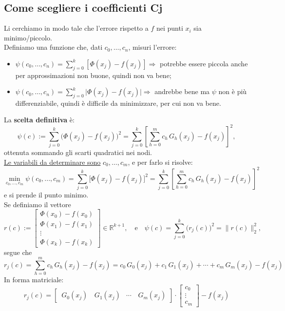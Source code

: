 \documentclass[12pt,a4paper,]{report}
\begin{document}
\subsection{Come scegliere i coefficienti Cj}
Li cerchiamo in modo tale che l'errore rispetto a $f$ nei punti $x_i$ sia minimo/piccolo.\\
Definiamo una funzione che, dati $c_0, \ldots, c_n$, misuri l'errore:
\begin{itemize}
    \item
    $
    \psi(c_0, \ldots, c_n)
    = \sum_{j=0}^{k} \left[ \Phi(x_j) - f(x_j) \right] \Rightarrow
    $
    potrebbe essere piccola anche per approssimazioni non buone,
    quindi non va bene;

    \item
    $
    \psi(c_0, \ldots, c_n)
    = \sum_{j=0}^{k} \lvert \Phi(x_j) - f(x_j) \rvert \Rightarrow
    $
    andrebbe bene ma $\psi$ non \`e pi\`u differenziabile,
    quindi \`e difficile da minimizzare, per cui non va bene.
\end{itemize}
La \textbf{scelta definitiva} \`e:
\[
\psi(c)
:= \sum_{j=0}^{k} \bigl( \Phi(x_j) - f(x_j) \bigr)^2
= \sum_{j=0}^{k}
\left[
\sum_{h=0}^{m} c_h \, G_h(x_j) - f(x_j)
\right]^2,
\]
ottenuta sommando gli scarti quadratici nei nodi.\\
\uline{Le variabili da determinare sono} $\boxed{c_0, \dots, c_m}$, e per farlo si risolve:
\[
\boxed{
\min_{c_0, \dots, c_m} \psi(c_0, ..., c_m)
= \sum_{j=0}^{k} \bigl[ \Phi(x_j) - f(x_j) \bigr]^2
}
= \sum_{j=0}^{k}
\left[
\sum_{h=0}^{m} c_h \, G_h(x_j) - f(x_j)
\right]^2
\]
e si prende il punto minimo.\\
Se definiamo il vettore
\[
r(c) :=
\begin{bmatrix}
\Phi(x_0) - f(x_0) \\[-10pt]
\Phi(x_1) - f(x_1) \\[-10pt]
\vdots \\[-10pt]
\Phi(x_k) - f(x_k)
\end{bmatrix}
\in \mathbb{R}^{k+1},
\quad \text{e} \quad
\psi(c)
= \sum_{j=0}^{k} \bigl(r_j(c)\bigr)^2
= \|r(c)\|_2^2,
\]
segue che
\[
r_j(c)
= \sum_{h=0}^{m} c_h \, G_h(x_j) - f(x_j)
= c_0 \, G_0(x_j) + c_1 \, G_1(x_j) + \cdots + c_m \, G_m(x_j) - f(x_j)
\]
In forma matriciale:
\[
r_j(c)
=
\begin{bmatrix}
\, G_0(x_j) & \, G_1(x_j) & \cdots & \, G_m(x_j)
\end{bmatrix}
\cdot
\begin{bmatrix}
c_0 \\[-10pt] \vdots \\[-10pt] c_m
\end{bmatrix}
- f(x_j)
\]
\end{document}
